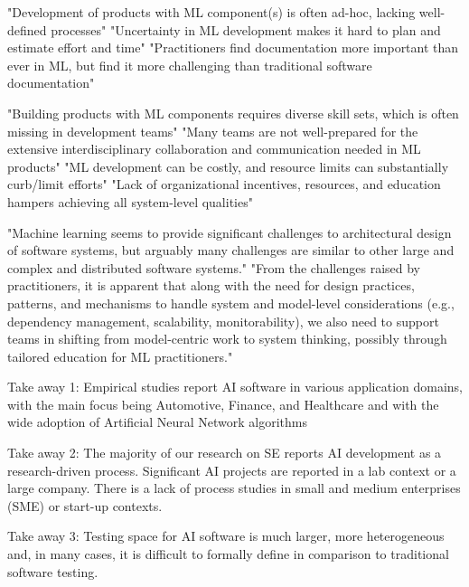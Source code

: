 "Development of products with ML component(s) is often ad-hoc, lacking
well-defined processes"
"Uncertainty in ML development makes it hard to plan and estimate effort and
time"
"Practitioners find documentation more important than ever in ML, but find it
more challenging than traditional software documentation"

"Building products with ML components requires diverse skill sets, which is
often missing in development teams"
"Many teams are not well-prepared for the extensive interdisciplinary
collaboration and communication needed in ML products"
"ML development can be costly, and resource limits can substantially curb/limit
efforts"
"Lack of organizational incentives, resources, and education hampers achieving
all system-level qualities"

"Machine learning seems to provide significant challenges to architectural design
of software systems, but arguably many challenges are similar to other large and
complex and distributed software systems."
"From the challenges raised by practitioners, it is apparent that along with the
need for design practices, patterns, and mechanisms to handle system and
model-level considerations (e.g., dependency management, scalability,
monitorability), we also need to support teams in shifting from model-centric
work to system thinking, possibly through tailored education for ML
practitioners."


\parencite{Nascimento2020SoftwareReview}

Take away 1: Empirical studies report AI software in various application
domains, with the main focus being Automotive, Finance, and Healthcare and with
the wide adoption of Artificial Neural Network algorithms

Take away 2: The majority of our research on SE reports AI development as a
research-driven process. Significant AI projects are reported in a lab context
or a large company. There is a lack of process studies in small and medium
enterprises (SME) or start-up contexts.

Take away 3: Testing space for AI software is much larger, more heterogeneous
and, in many cases, it is difficult to formally define in comparison to
traditional software testing.

